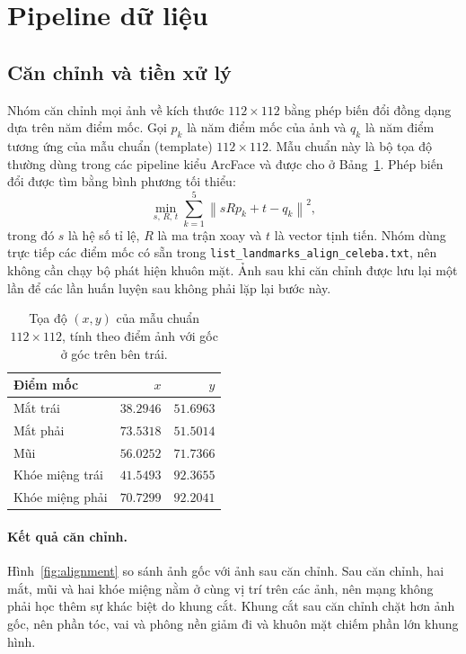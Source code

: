 \documentclass[a4paper,12pt]{article}
\begin{document}
\section{Pipeline dữ liệu}\label{sec:data-pipeline}

\subsection{Căn chỉnh và tiền xử lý}\label{sec:alignment}
Nhóm căn chỉnh mọi ảnh về kích thước $112 \times 112$ bằng phép biến đổi đồng dạng dựa trên năm điểm mốc. Gọi $p_k$ là năm điểm mốc của ảnh và $q_k$ là năm điểm tương ứng của mẫu chuẩn (template) $112 \times 112$. Mẫu chuẩn này là bộ tọa độ thường dùng trong các pipeline kiểu ArcFace và được cho ở Bảng~\ref{tab:template}. Phép biến đổi được tìm bằng bình phương tối thiểu:
\begin{equation}
    \min_{s,\,R,\,t} \sum_{k=1}^{5} \left\lVert s R p_k + t - q_k \right\rVert^2,
\end{equation}
trong đó $s$ là hệ số tỉ lệ, $R$ là ma trận xoay và $t$ là vector tịnh tiến. Nhóm dùng trực tiếp các điểm mốc có sẵn trong \texttt{list\_landmarks\_align\_celeba.txt}, nên không cần chạy bộ phát hiện khuôn mặt. Ảnh sau khi căn chỉnh được lưu lại một lần để các lần huấn luyện sau không phải lặp lại bước này.

\begin{table}[ht]
    \centering
    \caption{Tọa độ $(x, y)$ của mẫu chuẩn $112 \times 112$, tính theo điểm ảnh với gốc ở góc trên bên trái.}
    \label{tab:template}
    \begin{tabular}{lrr}
        \toprule
        Điểm mốc        & $x$       & $y$       \\
        \midrule
        Mắt trái        & $38.2946$ & $51.6963$ \\
        Mắt phải        & $73.5318$ & $51.5014$ \\
        Mũi             & $56.0252$ & $71.7366$ \\
        Khóe miệng trái & $41.5493$ & $92.3655$ \\
        Khóe miệng phải & $70.7299$ & $92.2041$ \\
        \bottomrule
    \end{tabular}
\end{table}

\paragraph{Kết quả căn chỉnh.} Hình~\ref{fig:alignment} so sánh ảnh gốc với ảnh sau căn chỉnh. Sau căn chỉnh, hai mắt, mũi và hai khóe miệng nằm ở cùng vị trí trên các ảnh, nên mạng không phải học thêm sự khác biệt do khung cắt. Khung cắt sau căn chỉnh chặt hơn ảnh gốc, nên phần tóc, vai và phông nền giảm đi và khuôn mặt chiếm phần lớn khung hình.
\end{document}
